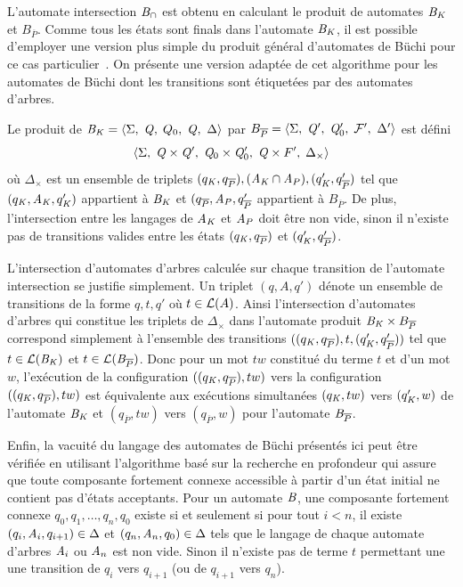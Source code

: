 L'automate intersection $\mathit B_\cap$ est obtenu en calculant le produit de automates $\mathit B_\mathit K$ et $B_{\overline{P}}$.
Comme tous les états sont finals dans l'automate $\mathit B_\mathit K$, il est possible d'employer une version plus
simple du produit général d'automates de Büchi pour ce cas particulier~\cite{MC-Book}. On présente une version
adaptée de cet algorithme pour les automates de Büchi dont les transitions sont étiquetées par des automates d'arbres.
%
\begin{definition}
  Le produit de $\mathit B_\mathit K = \langle \Sigma,\; \mathit Q,\; Q_0,\; \mathit Q,\ \Delta\rangle$ par 
  $B_{\overline{P}} = \langle\Sigma,\; \mathit Q',\;\mathit Q'_0,\; \mathcal{F}',\ \Delta'\rangle$ est défini
  \[\langle \Sigma,\; \mathit Q \times \mathit Q',\; \mathit Q_0 \times \mathit Q'_0,\; \mathit Q \times F',\; \Delta_\times\rangle \]
  où $\Delta_\times$ est un ensemble de triplets $(q_\mathit K, q_{\overline{P}}), (\mathit A_\mathit K\cap\mathit A_P), (q'_\mathit K, q'_{\overline{P}})$ tel que $(q_\mathit K,
  {\mathit A_\mathit K}, q'_\mathit K)$ appartient à $\mathit B_\mathit K$ et $(q_{\overline{P}},{\mathit A_P}, q'_{\overline{P}}$ appartient à $B_{\overline{P}}$. De plus, 
  l'intersection entre les langages de $\mathit A_\mathit K$ et $\mathit A_P$ doit être non vide, sinon il n'existe pas de transitions
  valides entre les états $(q_\mathit K, q_{\overline{P}})$  et $(q'_\mathit K, q'_{\overline{P}})$.
\end{definition}
L'intersection d'automates d'arbres calculée sur chaque transition de
l'automate intersection se justifie simplement. Un triplet 
$(q, A, q')$ dénote un ensemble de transitions de la
forme $q, t, q'$ où $t \in \mathcal{L}(A)$. Ainsi l'intersection d'automates d'arbres qui constitue
les triplets de $\Delta_\times$ dans l'automate produit $\mathit B_\mathit K \times B_{\overline{P}}$ correspond
simplement à l'ensemble des transitions $((q_\mathit K, q_{\overline{P}}), t, (q_\mathit K',q_{\overline{P}}'))$
tel que $t \in \mathcal{L}(\mathit B_\mathit K)$ et $t \in \mathcal{L}(\mathit B_{\overline{P}})$. Donc pour un mot $tw$
constitué du terme $t$ et d'un mot $w$, l'exécution de la configuration  $((q_\mathit K, q_{\overline{P}}), tw)$ 
vers la configuration $((q_\mathit K, q_{\overline{P}}), tw)$ est équivalente aux exécutions simultanées 
$(q_\mathit K, tw)$ vers $(q'_\mathit K, w)$ de l'automate $\mathit B_\mathit K$ et $(q_{\overline{P}}, tw)$ vers $(q_{\overline{P}}, w)$ 
pour l'automate $\mathit B_{\overline{P}}$.

Enfin, la vacuité du langage des automates de Büchi présentés ici peut être vérifiée en utilisant l'algorithme
basé sur la recherche en profondeur qui assure que toute composante fortement connexe accessible à partir d'un état initial
ne contient pas d'états acceptants. Pour un automate $\mathit B$, une composante fortement connexe $q_0, q_1, \dots, q_n, q_0$ existe
si et seulement si pour tout $i < n$, il existe $(q_i, \mathit A_i, q_{i+1}) \in \Delta$ et $(q_n, \mathit A_n, q_0) \in \Delta$
tels que le langage de chaque automate d'arbres $\mathit A_i$ ou $\mathit A_n$ est non vide. Sinon il n'existe pas de terme $t$ permettant une
une transition de $q_i$ vers $q_{i+1}$ (ou de $q_{i+1}$ vers $q_n$).


